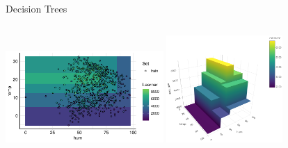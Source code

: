 \documentclass[10pt,compress,t,notes=noshow, xcolor=table]{beamer}
\begin{document}
\begin{frame}{Decision Trees }
\begin{columns}[T, totalwidth=\textwidth]
\begin{column}{0.35\textwidth}
\end{column}
\end{columns}
\begin{center}
\includegraphics[width=0.45\textwidth]{figure/tree_surface1.pdf} \qquad  
\includegraphics[width=0.33\textwidth]{figure/tree_surface2.png}
\end{center}

\end{frame}



\end{document}
